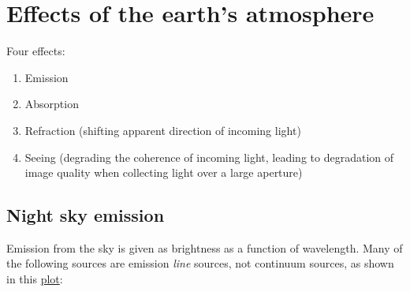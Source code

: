 \documentclass[12pt]{article}
\begin{document}
\newpage
\section{Effects of the earth's atmosphere}
Four effects:
\begin{enumerate}
    \item Emission
    \item Absorption
    \item Refraction (shifting apparent direction of incoming light)
    \item Seeing (degrading the coherence of incoming light,
        leading to degradation of image quality when collecting light
        over a large aperture)
\end{enumerate}

\subsection{Night sky emission}
Emission from the sky is given as brightness as a function of wavelength.
Many of the following sources are emission \emph{line} sources, not continuum
sources, as shown in this \href{http://astronomy.nmsu.edu/holtz/a535/html/diagrams/a535/skyemiss.htm}
{plot}:
\end{document}
